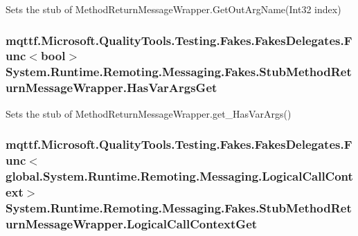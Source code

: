 Sets the stub of Method\-Return\-Message\-Wrapper.\-Get\-Out\-Arg\-Name(\-Int32 index)

\hypertarget{class_system_1_1_runtime_1_1_remoting_1_1_messaging_1_1_fakes_1_1_stub_method_return_message_wrapper_ab5edcd48a60e7bd1839a8355874cbbb1}{
\subsubsection[{Has\-Var\-Args\-Get}]{\setlength{\rightskip}{0pt plus 5cm}mqttf.\-Microsoft.\-Quality\-Tools.\-Testing.\-Fakes.\-Fakes\-Delegates.\-Func$<$bool$>$ System.\-Runtime.\-Remoting.\-Messaging.\-Fakes.\-Stub\-Method\-Return\-Message\-Wrapper.\-Has\-Var\-Args\-Get}}\label{class_system_1_1_runtime_1_1_remoting_1_1_messaging_1_1_fakes_1_1_stub_method_return_message_wrapper_ab5edcd48a60e7bd1839a8355874cbbb1}


Sets the stub of Method\-Return\-Message\-Wrapper.\-get\-\_\-\-Has\-Var\-Args()

\hypertarget{class_system_1_1_runtime_1_1_remoting_1_1_messaging_1_1_fakes_1_1_stub_method_return_message_wrapper_a1368df549ec4c46ade358a0e137a317d}{
\subsubsection[{Logical\-Call\-Context\-Get}]{\setlength{\rightskip}{0pt plus 5cm}mqttf.\-Microsoft.\-Quality\-Tools.\-Testing.\-Fakes.\-Fakes\-Delegates.\-Func$<$global.\-System.\-Runtime.\-Remoting.\-Messaging.\-Logical\-Call\-Context$>$ System.\-Runtime.\-Remoting.\-Messaging.\-Fakes.\-Stub\-Method\-Return\-Message\-Wrapper.\-Logical\-Call\-Context\-Get}}\label{class_system_1_1_runtime_1_1_remoting_1_1_messaging_1_1_fakes_1_1_stub_method_return_message_wrapper_a1368df549ec4c46ade358a0e137a317d}


